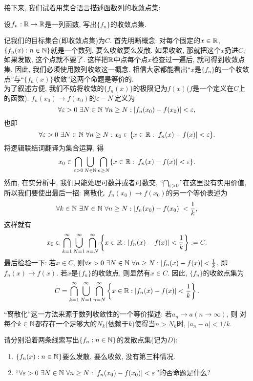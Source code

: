 接下来, 我们试着用集合语言描述函数列的收敛点集:
\begin{example}
设$f_n: \mathbb{R} \to \mathbb{R}$是一列函数, 写出$\{f_n\}$的收敛点集.
\end{example}
\begin{solution}
    记我们的目标集合(即收敛点集)为$C$. 
    首先明晰概念: 对每个固定的$x \in \mathbb{R}$, $\{f_n(x): n \in \mathbb{N}\}$就是一个数列, 要么收敛要么发散. 如果收敛, 那就把这个$x$扔进$C$; 如果发散, 这个点就不要了. 这样把$\mathbb{R}$中点每个点$x$检查过一遍后, 就可得到收敛点集. 
    因此, 我们必须使用数列收敛这一概念. 相信大家都能看出“$x$是$\{f_n\}$的一个收敛点”与“$\{f_n(x)\}$收敛”这两个命题是等价的. \\
    为了叙述方便, 我们不妨将收敛的$\{f_n(x)\}$的极限记为$f(x)$($f$是一个定义在$C$上的函数). $f_n(x_0) \to f(x_0)$的$\varepsilon-N$定义为
    $$\forall \varepsilon>0~ \exists N \in \mathbb{N}~ \forall n \geq N: |f_n(x_0)-f(x_0)| < \varepsilon,$$
    也即
    $$\forall \varepsilon>0~ \exists N \in \mathbb{N}~ \forall n \geq N:
    x_0 \in \{x \in \mathbb{R}: |f_n(x)-f(x)| < \varepsilon\}.$$
    将逻辑联结词翻译为集合运算, 得
    $$x_0 \in \bigcap_{\varepsilon>0}\bigcup_{N\in \mathbb{N}}\bigcap_{n\geq N}\{x \in \mathbb{R}: |f_n(x)-f(x)| < \varepsilon\}.$$
    然而, 在实分析中, 我们只能处理可数并或者可数交, 
    “$\bigcap_{\varepsilon>0}$”在这里没有实用价值, 所以我们要使出最后一招: 离散化. $f_n(x_0) \to f(x_0)$的另一个等价表述为
    $$\forall k\in \mathbb{N}~ \exists N \in \mathbb{N}~ \forall n \geq N: |f_n(x_0)-f(x_0)| < \frac{1}{k},$$
    这样就有
    $$x_0 \in \bigcap_{k=1}^\infty \bigcup_{N=1}^\infty \bigcap_{n=N}^\infty 
    \left\{x \in \mathbb{R}: |f_n(x)-f(x)| < \frac{1}{k}\right\} := C.$$
    最后检验一下: 若$x \in C$, 则$\forall \varepsilon>0~ \exists N \in \mathbb{N}~ \forall n \geq N: |f_n(x)-f(x)| < \frac{1}{k}$, 
    即$f_n(x) \to f(x)$. 
    若$x$是$\{f_n\}$的收敛点, 则显然有$x \in C$. 因此, $\{f_n\}$的收敛点集为
    $$ C=\bigcap_{k=1}^\infty \bigcup_{N=1}^\infty \bigcap_{n=N}^\infty 
    \left\{x \in \mathbb{R}: |f_n(x)-f(x)| < \frac{1}{k}\right\}. $$
\end{solution}
\begin{remark}
    “离散化”这一方法来源于数列收敛性的一个等价描述: 若$a_n \to a (n \to \infty)$, 则
    对每个$k \in \mathbb{N}$都存在一个足够大的$N_k$(依赖于$k$)使得当$n>N_k$时, $|a_n-a|<1/k$.
\end{remark}
\begin{exercise}
    请分别沿着两条线索写出$\{f_n: n \in \mathbb{N}\}$的发散点集(记为$D$):
    \begin{enumerate}
    \item $\{f_n(x): n \in \mathbb{N}\}$要么发散, 要么收敛, 没有第三种情况.
    \item “$\forall \varepsilon>0~ \exists N \in \mathbb{N}~ \forall n \geq N: |f_n(x_0)-f(x_0)| < \varepsilon$”的否命题是什么?
    \end{enumerate}
\end{exercise}

